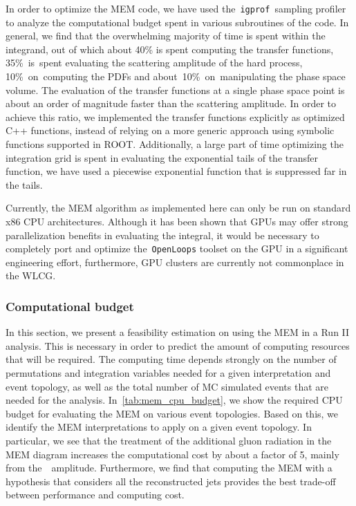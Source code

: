 In order to optimize the MEM code, we have used the~\texttt{igprof}~sampling profiler~\cite{Eulisse:2005zz,Tuura:2008zza} to analyze the computational budget spent in various subroutines of the code. In general, we find    
that the overwhelming majority of time is spent within the integrand, out of which about 40\% is spent computing the transfer functions, 35\%~is~spent evaluating the scattering amplitude of the hard process, 10\%~on~computing the PDFs and about~10\%~on~manipulating the phase space volume. The evaluation of the transfer functions at a single phase space point is about an order of magnitude faster than the scattering amplitude. In order to achieve this ratio, we implemented the transfer functions explicitly as optimized C++ functions, instead of relying on a more generic approach using symbolic functions supported in ROOT. Additionally, a large part of time optimizing the integration grid is spent in evaluating the exponential tails of the transfer function, we have used a piecewise exponential function that is suppressed far in the tails.

Currently, the MEM algorithm as implemented here can only be run on standard x86 CPU architectures. Although it has been shown that GPUs may offer strong parallelization benefits in evaluating the integral, it would be necessary to completely port and optimize the~\texttt{OpenLoops} toolset on the GPU in a significant engineering effort\cite{Schouten:2014yza}, furthermore, GPU clusters are currently not commonplace in the WLCG.

\subsubsection{Computational budget}
\label{sec:mem_computational}
In this section, we present a feasibility estimation on using the MEM in a Run II analysis. This is necessary in order to predict the amount of computing resources that will be required. The computing time depends strongly on the number of permutations and integration variables needed for a given interpretation and event topology, as well as the total number of MC simulated events that are needed for the analysis. In~\cref{tab:mem_cpu_budget}, we show the required CPU budget for evaluating the MEM on various event topologies. Based on this, we identify the MEM interpretations to apply on a given event topology. In particular, we see that the treatment of the additional gluon radiation in the MEM diagram increases the computational cost by about a factor of 5, mainly from the~\ttbb~amplitude. Furthermore, we find that computing the MEM with a hypothesis that considers all the reconstructed jets provides the best trade-off between performance and computing cost.

